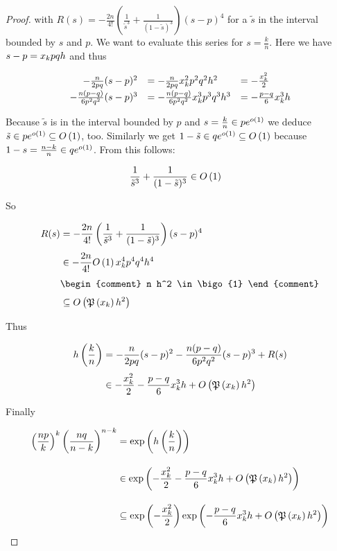 \begin{proof}
  with $R(s)=-\frac{2n}{4!} \left(\frac{1}{\tilde s^3}+\frac{1}{(1-\tilde s)^3}\right) (s-p)^4$ for a $\tilde s$ in the interval bounded by $s$ and $p$. We want to evaluate this series for $s=\frac kn$. Here we have $s-p=x_{k} pqh$ and thus

  \begin{align}
    \begin{array}{rll}
      -\frac{n}{2pq} (s-p)^2 &= -\frac{n}{2pq} \x^2 p^2 q^2 h^2 & = -\frac{\x^2}{2} \nl
      -\frac{n(p-q)}{6p^2q^2} (s-p)^3 &= -\frac{n(p-q)}{6p^2q^2} \x^3p^3q^3h^3 & = -\frac{p-q}{6} \x^3 h
    \end{array}
  \end{align}

  Because $\tilde s$ is in the interval bounded by $p$ and $s=\frac kn \in pe^{o\left( {1} \right)}$ we deduce $\tilde s \in pe^{o\left( {1} \right)}\subseteq O\left( {1} \right)$, too. Similarly we get $1-\tilde s\in qe^{o\left( {1} \right)} \subseteq O\left( {1} \right)$ because $1-s = \frac{n-k}{n} \in qe^{o\left( {1} \right)}$. From this follows:

  \begin{align}
    \frac 1{\tilde s^3} + \frac 1{(1-\tilde s)^3} & \in O\left( {1} \right)
  \end{align}

  \noindent So

  \begin{align}
    R(s) & = -\frac{2n}{4!} \left(\frac 1{\tilde s^3} + \frac 1{(1-\tilde s)^3}\right) (s-p)^4 \nl
    & \in -\frac{2n}{4!} \bigo{1} \x^4 p^4 q^4 h^4 \nl
    &
    \begin{comment}
      n h^2 \in \bigo{1}
    \end{comment} \nl
    & \subseteq \bigo{\pol{\x} h^2}
  \end{align}

  \noindent Thus

  \begin{align}
    \h{\frac kn} &=-\frac{n}{2pq} (s-p)^2 - \frac{n(p-q)}{6p^2q^2} (s-p)^3 + R(s) \nl
    & \in -\frac{\x^2}{2} - \frac{p-q}{6} \x^3 h + \bigo{\pol{\x} h^2}
  \end{align}

  \noindent Finally

  \begin{align}
    \left(\frac{np}{k}\right)^k \left(\frac{nq}{n-k}\right)^{n-k} & = \fexp{\h{\frac kn}} \bnl
    & \in \fexp{-\frac{\x^2}{2} - \frac{p-q}{6} \x^3 h + \bigo{\pol{\x} h^2}} \bnl
    & \subseteq \fexp{-\frac{\x^2}{2}} \fexp{-\frac{p-q}6 \x^3 h + \bigo{\pol{\x} h^2}}
  \end{align}


\end{proof}
